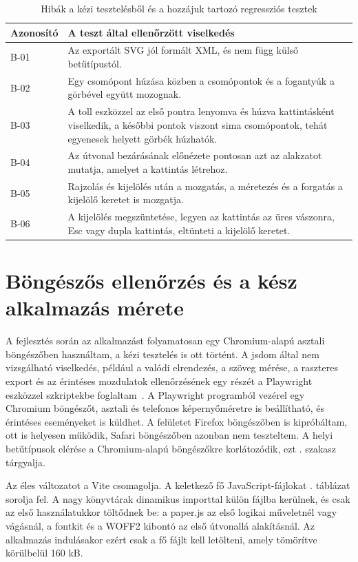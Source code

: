 \begin{table}[!htbp]
\caption{Hibák a kézi tesztelésből és a hozzájuk tartozó regressziós tesztek}
\label{tab:regressions}
\centering
\footnotesize
\begin{tabular}{|l|>{\raggedright\arraybackslash}p{}|}
\hline
\textbf{Azonosító} & \textbf{A teszt által ellenőrzött viselkedés} \\ \hline
B-01 & Az exportált SVG jól formált XML, és nem függ külső betűtípustól. \\ \hline
B-02 & Egy csomópont húzása közben a csomópontok és a fogantyúk a görbével együtt mozognak. \\ \hline
B-03 & A toll eszközzel az első pontra lenyomva és húzva kattintásként viselkedik, a későbbi pontok viszont sima csomópontok, tehát egyenesek helyett görbék húzhatók. \\ \hline
B-04 & Az útvonal bezárásának előnézete pontosan azt az alakzatot mutatja, amelyet a kattintás létrehoz. \\ \hline
B-05 & Rajzolás és kijelölés után a mozgatás, a méretezés és a forgatás a kijelölő keretet is mozgatja. \\ \hline
B-06 & A kijelölés megszüntetése, legyen az kattintás az üres vászonra, Esc vagy dupla kattintás, eltünteti a kijelölő keretet. \\ \hline
\end{tabular}
\end{table}

\section{Böngészős ellenőrzés és a kész alkalmazás mérete}
\label{sec:browser_check}

A fejlesztés során az alkalmazást folyamatosan egy Chromium-alapú asztali böngészőben használtam, a kézi tesztelés is ott történt. A jsdom által nem vizsgálható viselkedés, például a valódi elrendezés, a szöveg mérése, a raszteres export és az érintéses mozdulatok ellenőrzésének egy részét a Playwright eszközzel szkriptekbe foglaltam~\cite{playwright}. A Playwright programból vezérel egy Chromium böngészőt, asztali és telefonos képernyőméretre is beállítható, és érintéses eseményeket is küldhet. A felületet Firefox böngészőben is kipróbáltam, ott is helyesen működik, Safari böngészőben azonban nem teszteltem. A helyi betűtípusok elérése a Chromium-alapú böngészőkre korlátozódik, ezt . szakasz tárgyalja.

Az éles változatot a Vite csomagolja. A keletkező fő JavaScript-fájlokat . táblázat sorolja fel. A nagy könyvtárak dinamikus importtal külön fájlba kerülnek, és csak az első használatukkor töltődnek be: a paper.js az első logikai műveletnél vagy vágásnál, a fontkit és a WOFF2 kibontó az első útvonallá alakításnál. Az alkalmazás indulásakor ezért csak a fő fájlt kell letölteni, amely tömörítve körülbelül 160 kB.

